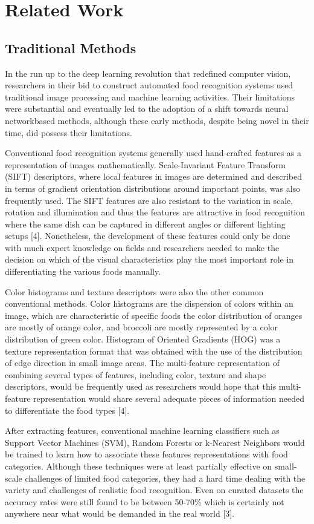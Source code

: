 \documentclass[12pt, openany]{report}
\begin{document}
\section{Related Work}
\subsection{Traditional Methods}
In the run up to the deep learning revolution that redefined computer vision, researchers in their bid to construct automated food recognition systems used traditional image processing and machine learning activities. Their limitations were substantial and eventually led to the adoption of a shift towards neural networkbased methods, although these early methods, despite being novel in their time, did possess their limitations.

Conventional food recognition systems generally used hand-crafted features as a representation of images mathematically. Scale-Invariant Feature Transform (SIFT) descriptors, where local features in images are determined and described in terms of gradient orientation distributions around important points, was also frequently used. The SIFT features are also resistant to the variation in scale, rotation and illumination and thus the features are attractive in food recognition where the same dish can be captured in different angles or different lighting setups [4].
Nonetheless, the development of these features could only be done with much expert knowledge on fields and researchers needed to make the decision on which of the visual characteristics play the most important role in differentiating the various foods manually.

Color histograms and texture descriptors were also the other common conventional methods. Color histograms are the dispersion of colors within an image, which are characteristic of specific foods the color distribution of oranges are mostly of orange color, and broccoli are mostly represented by a color distribution of green color. Histogram of Oriented Gradients (HOG) was a texture representation format that was obtained with the use of the distribution of edge direction in small image areas. The multi-feature representation of combining several types of features, including color, texture and shape descriptors, would be frequently used as researchers would hope that this multi-feature representation would share several adequate pieces of information needed to differentiate the food types [4].

After extracting features, conventional machine learning classifiers such as Support Vector Machines (SVM), Random Forests or k-Nearest Neighbors would be trained to learn how to associate these features representations with food categories. Although these techniques were at least partially effective on small-scale challenges of limited food categories, they had a hard time dealing with the variety and challenges of realistic food recognition. Even on curated datasets the accuracy rates were still found to be between 50-70\% which is certainly not anywhere near what would be demanded in the real world [3].
\end{document}
